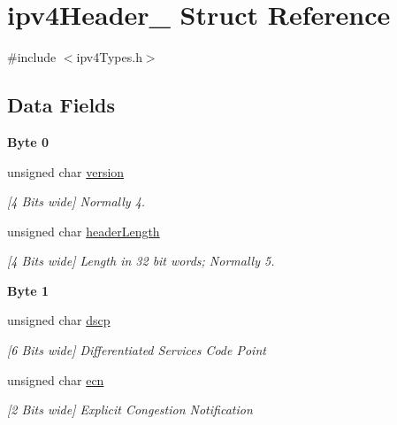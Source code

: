 \hypertarget{structipv4_header__}{}\section{ipv4\+Header\+\_\+ Struct Reference}
\label{structipv4_header__}


{\ttfamily \#include $<$ipv4\+Types.\+h$>$}

\subsection*{Data Fields}
\begin{Indent}\textbf{ Byte 0}\par
\begin{DoxyCompactItemize}
\item 
unsigned char \mbox{\hyperlink{structipv4_header___a278ac8112eb4d891fdffa2a26fb4de69}{version}}
\begin{DoxyCompactList}\small\item\em \mbox{[}4 Bits wide\mbox{]} Normally 4. \end{DoxyCompactList}\item 
unsigned char \mbox{\hyperlink{structipv4_header___af7e29b8f60e20e05bca935da9d1fb98c}{header\+Length}}
\begin{DoxyCompactList}\small\item\em \mbox{[}4 Bits wide\mbox{]} Length in 32 bit words; Normally 5. \end{DoxyCompactList}\end{DoxyCompactItemize}
\end{Indent}
\begin{Indent}\textbf{ Byte 1}\par
\begin{DoxyCompactItemize}
\item 
unsigned char \mbox{\hyperlink{structipv4_header___a73505d600361f7cfce789106f3eb854d}{dscp}}
\begin{DoxyCompactList}\small\item\em \mbox{[}6 Bits wide\mbox{]} Differentiated Services Code Point \end{DoxyCompactList}\item 
unsigned char \mbox{\hyperlink{structipv4_header___a6420d8488de5bd7f6523763e1bb5b278}{ecn}}
\begin{DoxyCompactList}\small\item\em \mbox{[}2 Bits wide\mbox{]} Explicit Congestion Notification \end{DoxyCompactList}\end{DoxyCompactItemize}
\end{Indent}
